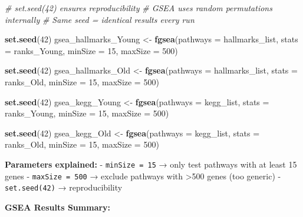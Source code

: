 \documentclass[
]{article}
\newenvironment{Shaded}{\begin{snugshade}}{\end{snugshade}}
\newcommand{\AttributeTok}[1]{\textcolor[rgb]{0.13,0.29,0.53}{#1}}
\newcommand{\CommentTok}[1]{\textcolor[rgb]{0.56,0.35,0.01}{\textit{#1}}}
\newcommand{\DecValTok}[1]{\textcolor[rgb]{0.00,0.00,0.81}{#1}}
\newcommand{\FunctionTok}[1]{\textcolor[rgb]{0.13,0.29,0.53}{\textbf{#1}}}
\newcommand{\NormalTok}[1]{#1}
\newcommand{\OtherTok}[1]{\textcolor[rgb]{0.56,0.35,0.01}{#1}}
\begin{document}
\begin{Shaded}
\begin{Highlighting}[]
\CommentTok{\# set.seed(42) ensures reproducibility}
\CommentTok{\# GSEA uses random permutations internally}
\CommentTok{\# Same seed = identical results every run}

\FunctionTok{set.seed}\NormalTok{(}\DecValTok{42}\NormalTok{)}
\NormalTok{gsea\_hallmarks\_Young }\OtherTok{\textless{}{-}} \FunctionTok{fgsea}\NormalTok{(}\AttributeTok{pathways =}\NormalTok{ hallmarks\_list,}
                               \AttributeTok{stats =}\NormalTok{ ranks\_Young,}
                               \AttributeTok{minSize =} \DecValTok{15}\NormalTok{, }\AttributeTok{maxSize =} \DecValTok{500}\NormalTok{)}

\FunctionTok{set.seed}\NormalTok{(}\DecValTok{42}\NormalTok{)}
\NormalTok{gsea\_hallmarks\_Old }\OtherTok{\textless{}{-}} \FunctionTok{fgsea}\NormalTok{(}\AttributeTok{pathways =}\NormalTok{ hallmarks\_list,}
                             \AttributeTok{stats =}\NormalTok{ ranks\_Old,}
                             \AttributeTok{minSize =} \DecValTok{15}\NormalTok{, }\AttributeTok{maxSize =} \DecValTok{500}\NormalTok{)}

\FunctionTok{set.seed}\NormalTok{(}\DecValTok{42}\NormalTok{)}
\NormalTok{gsea\_kegg\_Young }\OtherTok{\textless{}{-}} \FunctionTok{fgsea}\NormalTok{(}\AttributeTok{pathways =}\NormalTok{ kegg\_list,}
                          \AttributeTok{stats =}\NormalTok{ ranks\_Young,}
                          \AttributeTok{minSize =} \DecValTok{15}\NormalTok{, }\AttributeTok{maxSize =} \DecValTok{500}\NormalTok{)}

\FunctionTok{set.seed}\NormalTok{(}\DecValTok{42}\NormalTok{)}
\NormalTok{gsea\_kegg\_Old }\OtherTok{\textless{}{-}} \FunctionTok{fgsea}\NormalTok{(}\AttributeTok{pathways =}\NormalTok{ kegg\_list,}
                        \AttributeTok{stats =}\NormalTok{ ranks\_Old,}
                        \AttributeTok{minSize =} \DecValTok{15}\NormalTok{, }\AttributeTok{maxSize =} \DecValTok{500}\NormalTok{)}
\end{Highlighting}
\end{Shaded}

\textbf{Parameters explained:} - \texttt{minSize\ =\ 15} → only test
pathways with at least 15 genes - \texttt{maxSize\ =\ 500} → exclude
pathways with \textgreater500 genes (too generic) -
\texttt{set.seed(42)} → reproducibility

\textbf{GSEA Results Summary:}
\end{document}
